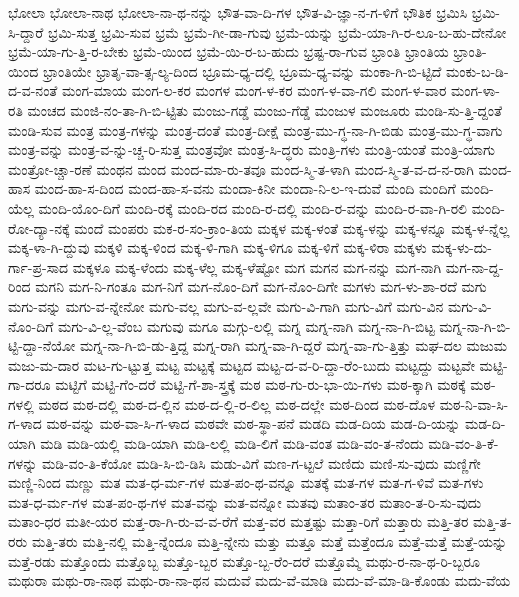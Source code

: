 {ಭೋಲಾ
ಭೋಲಾ-ನಾಥ
ಭೋಲಾ-ನಾ-ಥ-ನನ್ನು
ಭೌತ-ವಾ-ದಿ-ಗಳ
ಭೌತ-ವಿ-ಜ್ಞಾ-ನ-ಗ-ಳಿಗೆ
ಭೌತಿಕ
ಭ್ರಮಿಸಿ
ಭ್ರಮಿ-ಸಿ-ದ್ದಾರೆ
ಭ್ರಮಿ-ಸುತ್ತ
ಭ್ರಮಿ-ಸುವ
ಭ್ರಮೆ
ಭ್ರಮೆ-ಗೀ-ಡಾ-ಗುವು
ಭ್ರಮೆ-ಯನ್ನು
ಭ್ರಮೆ-ಯಾ-ಗಿ-ರ-ಲೂ-ಬ-ಹು-ದೇನೋ
ಭ್ರಮೆ-ಯಾ-ಗು-ತ್ತಿ-ರ-ಬೇಕು
ಭ್ರಮೆ-ಯಿಂದ
ಭ್ರಮೆ-ಯಿ-ರ-ಬ-ಹುದು
ಭ್ರಷ್ಟ-ರಾ-ಗುವ
ಭ್ರಾಂತಿ
ಭ್ರಾಂತಿಯ
ಭ್ರಾಂತಿ-ಯಿಂದ
ಭ್ರಾಂತಿಯೇ
ಭ್ರಾತೃ-ವಾ-ತ್ಸ-ಲ್ಯ-ದಿಂದ
ಭ್ರೂಮ-ಧ್ಯ-ದಲ್ಲಿ
ಭ್ರೂಮ-ಧ್ಯ-ವನ್ನು
ಮಂಕಾ-ಗಿ-ಬಿ-ಟ್ಟಿದೆ
ಮಂಕು-ಬ-ಡಿ-ದ-ವ-ನಂತೆ
ಮಂಗ-ಮಾಯ
ಮಂಗ-ಲ-ಕರ
ಮಂಗಳ
ಮಂಗ-ಳ-ಕರ
ಮಂಗ-ಳ-ವಾ-ಗಲಿ
ಮಂಗ-ಳ-ವಾರ
ಮಂಗ-ಳಾ-ರತಿ
ಮಂಚದ
ಮಂಜಿ-ನಂ-ತಾ-ಗಿ-ಬಿ-ಟ್ಟಿತು
ಮಂಜು-ಗಡ್ಡೆ
ಮಂಜು-ಗೆಡ್ಡೆ
ಮಂಜುಳ
ಮಂಜೂರು
ಮಂಡಿ-ಸು-ತ್ತಿ-ದ್ದಂತೆ
ಮಂಡಿ-ಸುವ
ಮಂತ್ರ
ಮಂತ್ರ-ಗಳನ್ನು
ಮಂತ್ರ-ದಂತೆ
ಮಂತ್ರ-ದೀಕ್ಷೆ
ಮಂತ್ರ-ಮು-ಗ್ಧ-ನಾ-ಗಿ-ಬಿಡು
ಮಂತ್ರ-ಮು-ಗ್ಧ-ವಾಗು
ಮಂತ್ರ-ವನ್ನು
ಮಂತ್ರ-ವ-ನ್ನು-ಚ್ಚ-ರಿ-ಸುತ್ತ
ಮಂತ್ರವೋ
ಮಂತ್ರ-ಸಿ-ದ್ಧರು
ಮಂತ್ರಿ-ಗಳು
ಮಂತ್ರಿ-ಯಂತೆ
ಮಂತ್ರಿ-ಯಾಗು
ಮಂತ್ರೋ-ಚ್ಚಾ-ರಣೆ
ಮಂಥನ
ಮಂದ
ಮಂದ-ಮಾ-ರು-ತವೂ
ಮಂದ-ಸ್ಮಿ-ತ-ಳಾಗಿ
ಮಂದ-ಸ್ಮಿ-ತ-ವ-ದ-ನ-ರಾಗಿ
ಮಂದ-ಹಾಸ
ಮಂದ-ಹಾ-ಸ-ದಿಂದ
ಮಂದ-ಹಾ-ಸ-ವನು
ಮಂದಾ-ಕಿನೀ
ಮಂದಾ-ನಿ-ಲ-ಇ-ದುವೆ
ಮಂದಿ
ಮಂದಿಗೆ
ಮಂದಿ-ಯೆಲ್ಲ
ಮಂದಿ-ಯೊಂ-ದಿಗೆ
ಮಂದಿ-ರಕ್ಕೆ
ಮಂದಿ-ರದ
ಮಂದಿ-ರ-ದಲ್ಲಿ
ಮಂದಿ-ರ-ವನ್ನು
ಮಂದಿ-ರ-ವಾ-ಗಿ-ರಲಿ
ಮಂದಿ-ರೋ-ದ್ಯಾ-ನಕ್ಕೆ
ಮಂದೆ
ಮಂಪರು
ಮಕ-ರ-ಸಂ-ಕ್ರಾಂ-ತಿಯ
ಮಕ್ಕಳ
ಮಕ್ಕ-ಳಂತೆ
ಮಕ್ಕ-ಳನ್ನು
ಮಕ್ಕ-ಳನ್ನೂ
ಮಕ್ಕ-ಳ-ನ್ನೆಲ್ಲ
ಮಕ್ಕ-ಳಾ-ಗಿ-ದ್ದುವು
ಮಕ್ಕಳಿ
ಮಕ್ಕ-ಳಿಂದ
ಮಕ್ಕ-ಳಿ-ಗಾಗಿ
ಮಕ್ಕ-ಳಿಗೂ
ಮಕ್ಕ-ಳಿಗೆ
ಮಕ್ಕ-ಳಿರಾ
ಮಕ್ಕಳು
ಮಕ್ಕ-ಳು-ದು-ರ್ಗಾ-ಪ್ರ-ಸಾದ
ಮಕ್ಕಳೂ
ಮಕ್ಕ-ಳೆಂದು
ಮಕ್ಕ-ಳೆಲ್ಲ
ಮಕ್ಕ-ಳೆಷ್ಟೋ
ಮಗ
ಮಗನ
ಮಗ-ನನ್ನು
ಮಗ-ನಾಗಿ
ಮಗ-ನಾ-ದ್ದ-ರಿಂದ
ಮಗನಿ
ಮಗ-ನಿ-ಗಂತೂ
ಮಗ-ನಿಗೆ
ಮಗ-ನೊಂ-ದಿಗೆ
ಮಗ-ನೊಂ-ದಿಗೇ
ಮಗಳು
ಮಗ-ಳು-ಶಾ-ರದೆ
ಮಗು
ಮಗು-ವನ್ನು
ಮಗು-ವ-ನ್ನೇನೋ
ಮಗು-ವಲ್ಲ
ಮಗು-ವ-ಲ್ಲವೇ
ಮಗು-ವಿ-ಗಾಗಿ
ಮಗು-ವಿಗೆ
ಮಗು-ವಿನ
ಮಗು-ವಿ-ನೊಂ-ದಿಗೆ
ಮಗು-ವಿ-ಲ್ಲ-ವೆಂಬ
ಮಗುವು
ಮಗೂ
ಮಗ್ಗು-ಲಲ್ಲಿ
ಮಗ್ನ
ಮಗ್ನ-ನಾಗಿ
ಮಗ್ನ-ನಾ-ಗಿ-ಬಿಟ್ಟ
ಮಗ್ನ-ನಾ-ಗಿ-ಬಿ-ಟ್ಟಿ-ದ್ದಾ-ನೆಯೋ
ಮಗ್ನ-ನಾ-ಗಿ-ಬಿ-ಡು-ತ್ತಿದ್ದ
ಮಗ್ನ-ರಾಗಿ
ಮಗ್ನ-ವಾ-ಗಿ-ದ್ದರೆ
ಮಗ್ನ-ವಾ-ಗು-ತ್ತಿತ್ತು
ಮಘ-ದಲ
ಮಜುಮ
ಮಜು-ಮ-ದಾರ
ಮಟ-ಗು-ಟ್ಟುತ್ತ
ಮಟ್ಟ
ಮಟ್ಟಕ್ಕೆ
ಮಟ್ಟದ
ಮಟ್ಟ-ದ-ವ-ರಿ-ದ್ದಾ-ರೆಂ-ಬುದು
ಮಟ್ಟದ್ದು
ಮಟ್ಟವೇ
ಮಟ್ಟಿ-ಗಾ-ದರೂ
ಮಟ್ಟಿಗೆ
ಮಟ್ಟಿ-ಗೆಂ-ದರೆ
ಮಟ್ಟಿ-ಗೆ-ಶಾ-ಸ್ತ್ರಕ್ಕೆ
ಮಠ
ಮಠ-ಗು-ರು-ಭಾ-ಯಿ-ಗಳು
ಮಠ-ಕ್ಕಾಗಿ
ಮಠಕ್ಕೆ
ಮಠ-ಗಳಲ್ಲಿ
ಮಠದ
ಮಠ-ದಲ್ಲಿ
ಮಠ-ದ-ಲ್ಲಿನ
ಮಠ-ದ-ಲ್ಲಿ-ರ-ಲಿಲ್ಲ
ಮಠ-ದಲ್ಲೇ
ಮಠ-ದಿಂದ
ಮಠ-ದೊಳ
ಮಠ-ನಿ-ವಾ-ಸಿ-ಗ-ಳಾದ
ಮಠ-ವನ್ನು
ಮಠ-ವಾ-ಸಿ-ಗ-ಳಾದ
ಮಠವೇ
ಮಠ-ಸ್ಥಾ-ಪನೆ
ಮಡದಿ
ಮಡ-ದಿಯ
ಮಡ-ದಿ-ಯನ್ನು
ಮಡ-ದಿ-ಯಾಗಿ
ಮಡಿ
ಮಡಿ-ಯಲ್ಲಿ
ಮಡಿ-ಯಾಗಿ
ಮಡಿ-ಲಲ್ಲಿ
ಮಡಿ-ಲಿಗೆ
ಮಡಿ-ವಂತ
ಮಡಿ-ವಂ-ತ-ನೆಂದು
ಮಡಿ-ವಂ-ತಿ-ಕೆ-ಗಳನ್ನು
ಮಡಿ-ವಂ-ತಿ-ಕೆಯೋ
ಮಡಿ-ಸಿ-ಬಿ-ಡಿಸಿ
ಮಡು-ವಿಗೆ
ಮಣ-ಗ-ಟ್ಟಲೆ
ಮಣಿದು
ಮಣಿ-ಸು-ವುದು
ಮಣ್ಣಿಗೇ
ಮಣ್ಣಿ-ನಿಂದ
ಮಣ್ಣು
ಮತ
ಮತ-ಧ-ರ್ಮ-ಗಳ
ಮತ-ಪಂ-ಥ-ವನ್ನೂ
ಮತಕ್ಕೆ
ಮತ-ಗಳ
ಮತ-ಗ-ಳಿವೆ
ಮತ-ಗಳು
ಮತ-ಧ-ರ್ಮ-ಗಳ
ಮತ-ಪಂ-ಥ-ಗಳ
ಮತ-ವನ್ನು
ಮತ-ವನ್ನೋ
ಮತವು
ಮತಾಂ-ತರ
ಮತಾಂ-ತ-ರಿ-ಸು-ವುದು
ಮತಾಂ-ಧರ
ಮತೀ-ಯರ
ಮತ್ತ-ರಾ-ಗಿ-ರು-ವ-ವ-ರೆಗೆ
ಮತ್ತ-ವರ
ಮತ್ತಷ್ಟು
ಮತ್ತಾ-ರಿಗೆ
ಮತ್ತಾರು
ಮತ್ತಿ-ತರ
ಮತ್ತಿ-ತ-ರರು
ಮತ್ತಿ-ತರು
ಮತ್ತಿ-ನಲ್ಲಿ
ಮತ್ತಿ-ನ್ನೆಂದೂ
ಮತ್ತಿ-ನ್ನೇನು
ಮತ್ತು
ಮತ್ತೂ
ಮತ್ತೆ
ಮತ್ತೆಂದೂ
ಮತ್ತೆ-ಮತ್ತೆ
ಮತ್ತೆ-ಯನ್ನು
ಮತ್ತೆ-ರಡು
ಮತ್ತೊಂದು
ಮತ್ತೊಬ್ಬ
ಮತ್ತೊ-ಬ್ಬರ
ಮತ್ತೊ-ಬ್ಬ-ರೆಂ-ದರೆ
ಮತ್ತೊಮ್ಮೆ
ಮಥು-ರ-ನಾ-ಥ-ರಿ-ಬ್ಬರೂ
ಮಥುರಾ
ಮಥು-ರಾ-ನಾಥ
ಮಥು-ರಾ-ನಾ-ಥನ
ಮದುವೆ
ಮದು-ವೆ-ಮಾಡಿ
ಮದು-ವೆ-ಮಾ-ಡಿ-ಕೊಂಡು
ಮದು-ವೆಯ
}

